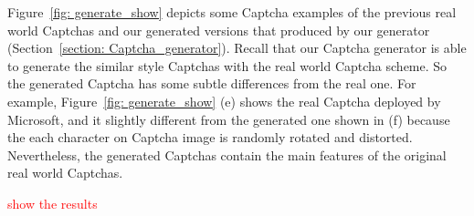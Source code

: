 Figure~\ref{fig: generate_show} depicts some Captcha examples of the previous real world Captchas and our generated versions that produced by our generator (Section~\ref{section: Captcha_generator}). Recall that our Captcha generator is able to generate the similar style Captchas with the real world Captcha scheme. So the generated Captcha has some subtle differences from the real one. For example, Figure~\ref{fig: generate_show} (e) shows the real Captcha deployed by Microsoft, and it slightly different from the generated one shown in (f) because the each character on Captcha image is randomly rotated and distorted.
Nevertheless, the generated Captchas contain the main features of the original real world Captchas.

\textcolor{red}{show the results}

\begin{figure}
  \centering
\end{figure}

